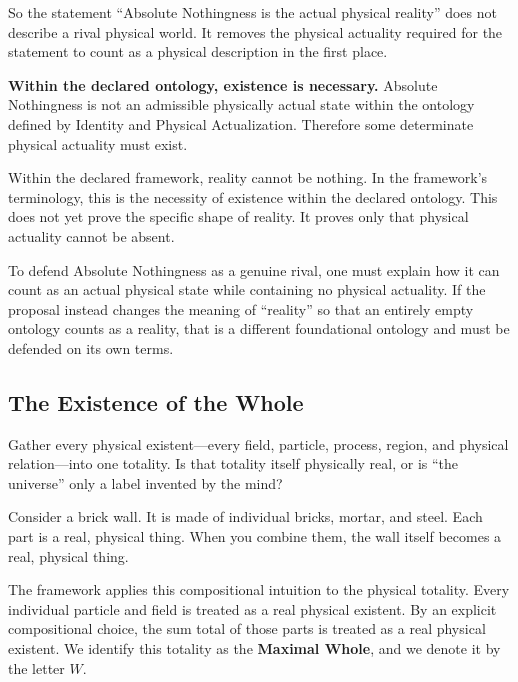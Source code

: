 \documentclass[11pt]{article}
\theoremstyle{canonstyle}
\begin{document}
So the statement ``Absolute Nothingness is the actual physical reality'' does not describe a rival physical world. It removes the physical actuality required for the statement to count as a physical description in the first place.

\begin{keyresult}
\textbf{Within the declared ontology, existence is necessary.} Absolute Nothingness is not an admissible physically actual state within the ontology defined by Identity and Physical Actualization. Therefore some determinate physical actuality must exist.
\end{keyresult}

Within the declared framework, reality cannot be nothing. In the framework's terminology, this is the necessity of existence within the declared ontology. This does not yet prove the specific shape of reality. It proves only that physical actuality cannot be absent.

\begin{ifyoudisagree}
To defend Absolute Nothingness as a genuine rival, one must explain how it can count as an actual physical state while containing no physical actuality. If the proposal instead changes the meaning of ``reality'' so that an entirely empty ontology counts as a reality, that is a different foundational ontology and must be defended on its own terms.
\end{ifyoudisagree}

\subsection{The Existence of the Whole}

\begin{reflect}
Gather every physical existent---every field, particle, process, region, and physical relation---into one totality. Is that totality itself physically real, or is ``the universe'' only a label invented by the mind?
\end{reflect}

Consider a brick wall. It is made of individual bricks, mortar, and steel. Each part is a real, physical thing. When you combine them, the wall itself becomes a real, physical thing. 

The framework applies this compositional intuition to the physical totality. Every individual particle and field is treated as a real physical existent. By an explicit compositional choice, the sum total of those parts is treated as a real physical existent. We identify this totality as the \textbf{Maximal Whole}, and we denote it by the letter $W$.
\end{document}
